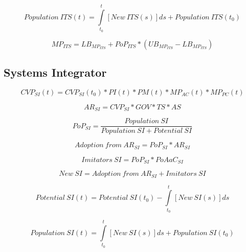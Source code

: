 \begin{equation}
	\mathit{Population~ITS(t)} = \int\limits_{t_0}^t [\mathit{New~ITS}(s)]ds + \mathit{Population~ITS(t_0)}
\end{equation}

\begin{equation}\label{eq:mp:its}
	MP_{ITS} = LB_{MP_{ITS}} + PoP_{ITS} * (UB_{MP_{ITS}} - LB_{MP_{ITS}})
\end{equation}

\subsection{Systems Integrator}\label{ch:app04:csf:si}

\begin{equation}
		CVP_{SI}(t) =  CVP_{SI}(t_0) * PI(t) * PM(t) * MP_{AC}(t) * MP_{PC}(t)
\end{equation}

\begin{equation}
		AR_{SI} = CVP_{SI} * GOV * TS * AS		
\end{equation}

\begin{equation}
	PoP_{SI} = \frac{\mathit{Population~SI}}{\mathit{Population~SI}+\mathit{Potential~SI}}
\end{equation}

\begin{equation}
	\mathit{Adoption~from~AR_{SI}} = PoP_{SI} * AR_{SI}
\end{equation}

\begin{equation}
	\mathit{Imitators~SI} = PoP_{SI} * PoAaC_{SI}
\end{equation}

\begin{equation}
	\mathit{New~SI} = \mathit{Adoption~from~AR_{SI}} + \mathit{Imitators~SI}
\end{equation}

\begin{equation}
	\mathit{Potential~SI(t)} =\mathit{Potential~SI(t_0)} - \int\limits_{t_0}^t  [\mathit{New~SI}(s)]ds
\end{equation}

\begin{equation}
	\mathit{Population~SI(t)} = \int\limits_{t_0}^t [\mathit{New~SI}(s)]ds + \mathit{Population~SI(t_0)}
\end{equation}

